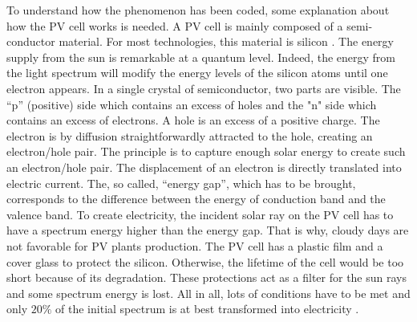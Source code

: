 \documentclass[soumission]{jsfds}
\begin{document}
To understand how the phenomenon has been coded, some explanation about how the PV cell works is needed. A PV cell is mainly composed of a semi-conductor material. For most technologies, this material is silicon \citep{luque2011}. The energy supply from the sun is remarkable at a quantum level. Indeed, the energy from the light spectrum will modify the energy levels of the silicon atoms until one electron appears. In a single crystal of semiconductor, two parts are visible. The ``p'' (positive) side which contains an excess of holes and the "n" side which contains an excess of electrons. A hole is an excess of a positive charge. The electron is by diffusion straightforwardly attracted to the hole, creating an electron/hole pair. The principle is to capture enough solar energy to create such an electron/hole pair. The displacement of an electron is directly  translated into electric current. The, so called, ``energy gap'', which has to be brought, corresponds to the difference between the energy of conduction band and the valence band. To create electricity, the incident solar ray on the PV cell has to have a spectrum energy higher than the energy gap. That is why, cloudy days are not favorable for PV plants production. The PV cell has a plastic film and a cover glass to protect the silicon. Otherwise, the lifetime of the cell would be too short because of its degradation. These protections act as a filter for the sun rays and some spectrum energy is lost. All in all, lots of conditions have to be met and only $20\%$ of the initial spectrum is at best transformed into electricity \citep{martin2001}. \newline
\end{document}

